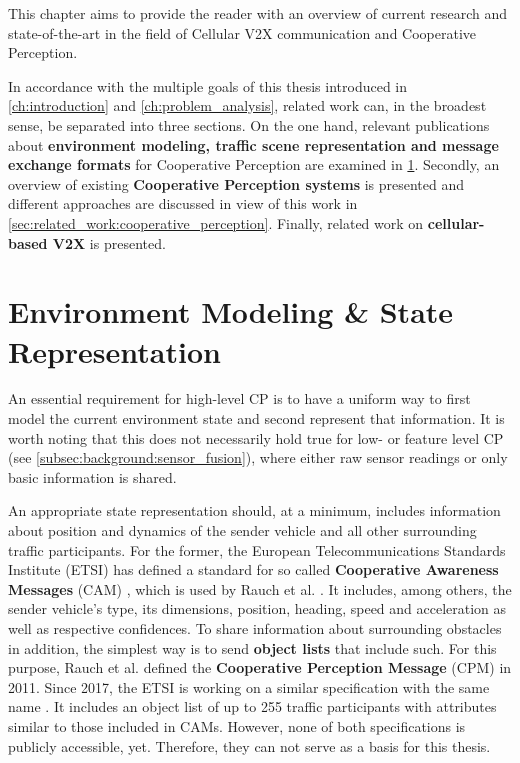 This chapter aims to provide the reader with an overview of current research and state-of-the-art in the field of Cellular V2X communication and Cooperative Perception.
\par
\bigskip

In accordance with the multiple goals of this thesis introduced in \cref{ch:introduction} and \cref{ch:problem_analysis}, related work can, in the broadest sense, be separated into three sections. On the one hand, relevant publications about \textbf{environment modeling, traffic scene representation and message exchange formats} for Cooperative Perception are examined in \cref{sec:related_work:environment_modeling_state_representation}. Secondly, an overview of existing \textbf{Cooperative Perception systems} is presented and different approaches are discussed in view of this work in \cref{sec:related_work:cooperative_perception}. Finally, related work on \textbf{cellular-based V2X} is presented.

\section{Environment Modeling \& State Representation}
\label{sec:related_work:environment_modeling_state_representation}
An essential requirement for high-level CP is to have a uniform way to first model the current environment state and second represent that information. It is worth noting that this does not necessarily hold true for low- or feature level CP (see \cref{subsec:background:sensor_fusion}), where either raw sensor readings or only basic information is shared.

An appropriate state representation should, at a minimum, includes information about position and dynamics of the sender vehicle and all other surrounding traffic participants. For the former, the European Telecommunications Standards Institute (ETSI) has defined a standard for so called \textbf{Cooperative Awareness Messages} (CAM) \cite{EuropeanTelecommunicationsStandardsInstituteETSI2011}, which is used by Rauch et al. \cite{Rauch2011}. It includes, among others, the sender vehicle's type, its dimensions, position, heading, speed and acceleration as well as respective confidences. To share information about surrounding obstacles in addition, the simplest way is to send \textbf{object lists} that include such. For this purpose, Rauch et al. \cite{Rauch2011} defined the \textbf{Cooperative Perception Message} (CPM) in 2011. Since 2017, the ETSI is working on a similar specification with the same name \cite{EuropeanTelecommunicationsStandardsInstituteETSI2019}. It includes an object list of up to 255 traffic participants \cite{Thandavarayan2019} with attributes similar to those included in CAMs. However, none of both specifications is publicly accessible, yet. Therefore, they can not serve as a basis for this thesis.

